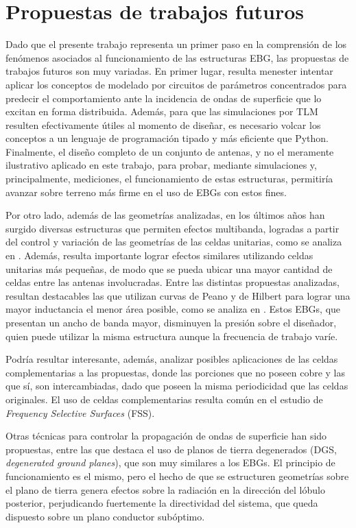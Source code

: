 \section{Propuestas de trabajos futuros}

Dado que el presente trabajo representa un primer paso en la comprensión de los fenómenos asociados al funcionamiento de las estructuras EBG, las propuestas de trabajos futuros son muy variadas. En primer lugar, resulta menester intentar aplicar los conceptos de modelado por circuitos de parámetros concentrados para predecir el comportamiento ante la incidencia de ondas de superficie que lo excitan en forma distribuida. Además, para que las simulaciones por TLM resulten efectivamente útiles al momento de diseñar, es necesario volcar los conceptos a un lenguaje de programación tipado y más eficiente que Python. Finalmente, el diseño completo de un conjunto de antenas, y no el meramente ilustrativo aplicado en este trabajo, para probar, mediante simulaciones y, principalmente, mediciones, el funcionamiento de estas estructuras, permitiría avanzar sobre terreno más firme en el uso de EBGs con estos fines.

Por otro lado, además de las geometrías analizadas, en los últimos años han surgido diversas estructuras que permiten efectos multibanda, logradas a partir del control y variación de las geometrías de las celdas unitarias, como se analiza en \cite{Kern:multiband}. Además, resulta importante lograr efectos similares utilizando celdas unitarias más pequeñas, de modo que se pueda ubicar una mayor cantidad de celdas entre las antenas involucradas. Entre las distintas propuestas analizadas, resultan destacables las que utilizan curvas de Peano y de Hilbert para lograr una mayor inductancia el menor área posible, como se analiza en \cite{McVay:Peano}. Estos EBGs, que presentan un ancho de banda mayor, disminuyen la presión sobre el diseñador, quien puede utilizar la misma estructura aunque la frecuencia de trabajo varíe.

Podría resultar interesante, además, analizar posibles aplicaciones de las celdas complementarias a las propuestas, donde las porciones que no poseen cobre y las que sí, son intercambiadas, dado que poseen la misma periodicidad que las celdas originales. El uso de celdas complementarias resulta común en el estudio de \textit{Frequency Selective Surfaces} (FSS).

Otras técnicas para controlar la propagación de ondas de superficie han sido propuestas, entre las que destaca el uso de planos de tierra degenerados (DGS, \textit{degenerated ground planes}), que son muy similares a los EBGs. El principio de funcionamiento es el mismo, pero el hecho de que se estructuren geometrías sobre el plano de tierra genera efectos sobre la radiación en la dirección del lóbulo posterior, perjudicando fuertemente la directividad del sistema, que queda dispuesto sobre un plano conductor subóptimo.

